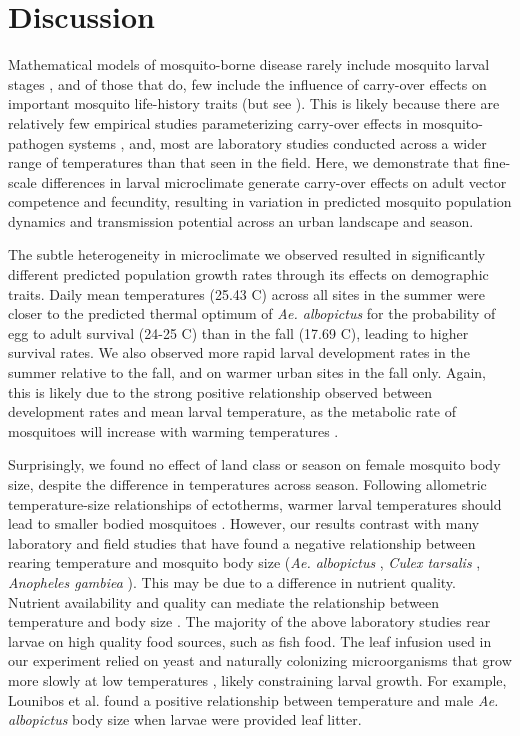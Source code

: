 \documentclass[12pt]{article}
\begin{document}
\section{Discussion}

Mathematical models of mosquito-borne disease rarely include mosquito larval stages \citep{reiner2013}, and of those that do, few include the influence of carry-over effects on important mosquito life-history traits (but see \citep{roux2015a}). This is likely because there are relatively few empirical studies parameterizing carry-over effects in mosquito-pathogen systems \citep{parham2015}, and, most are laboratory studies conducted across a wider range of temperatures than that seen in the field. Here, we demonstrate that fine-scale differences in larval microclimate generate carry-over effects on adult vector competence and fecundity, resulting in variation in predicted mosquito population dynamics and transmission potential across an urban landscape and season.

The subtle heterogeneity in microclimate we observed resulted in significantly different predicted population growth rates through its effects on demographic traits. Daily mean temperatures (25.43 \degree C) across all sites in the summer were closer to the predicted thermal optimum of \textit{Ae. albopictus} for the probability of egg to adult survival (24-25 \degree C) \citep{mordecai2017} than in the fall (17.69 \degree C), leading to higher survival rates. We also observed more rapid larval development rates in the summer relative to the fall, and on warmer urban sites in the fall only. Again, this is likely due to the strong positive relationship observed between development rates and  mean larval temperature, as the metabolic rate of mosquitoes will increase with warming temperatures \citep{delatte2009}.

Surprisingly, we found no effect of land class or season on female mosquito body size, despite the difference in temperatures across season. Following allometric temperature-size relationships of ectotherms, warmer larval temperatures should lead to smaller bodied mosquitoes \citep{angilleta2004}. However, our results contrast with many laboratory and field studies that have found a negative relationship between rearing temperature and mosquito body size (\textit{Ae. albopictus} \citep{reiskind2012a, murdock2017}, \textit{Culex tarsalis} \citep{dodson2012}, \textit{Anopheles gambiea} \citep{koella1996}). This may be due to a difference in nutrient quality. Nutrient availability and quality can mediate the relationship between temperature and body size \citep{farjana2011}. The majority of the above laboratory studies rear larvae on high quality food sources, such as fish food. The leaf infusion used in our experiment relied on yeast and naturally colonizing microorganisms that grow more slowly at low temperatures \citep{ratkowsky1982}, likely constraining larval growth. For example, Lounibos et al. \citep{lounibos2002} found a positive relationship between temperature and male \textit{Ae. albopictus} body size when larvae were provided leaf litter.
\end{document}
